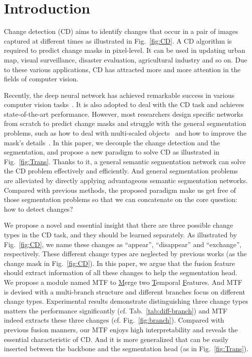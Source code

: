 \documentclass[review]{elsarticle}
\begin{document}
\section{Introduction}
\label{sec:intro}

Change detection (CD) aims to identify changes that occur in a pair of images captured at different times as illustrated in Fig.~\ref{fig:CD}. A CD algorithm is required to predict change masks in pixel-level. It can be used in updating urban map, visual surveillance, disaster evaluation, agricultural industry and so on. Due to these various applications, CD has attracted more and more attention in the fields of computer vision.

Recently, the deep neural network has achieved remarkable success in various computer vision tasks~\cite{wang2022versatile}. It is also adopted to deal with the CD task and achieves state-of-the-art performance. However, most researchers design specific networks from scratch to predict change masks and struggle with the general segmentation problems, such as how to deal with multi-scaled objects~\cite{HPCFNet} and how to improve the mask's details~\cite{DR_TANet}. In this paper, we decouple the change detection and the segmentation, and propose a new paradigm to solve CD as illustrated in Fig.~\ref{fig:Trans}. Thanks to it, a general semantic segmentation network can solve the CD problem effectively and efficiently. And general segmentation problems are alleviated by directly applying advantageous semantic segmentation networks. Compared with previous methods, the proposed paradigm make us get free of those segmentation problems so that we can concatenate on the core question: how to detect changes?

We propose a novel and essential insight that there are three possible change types in the CD task, and they should be learned separately. As illustrated by Fig.~\ref{fig:CD}, we name these changes as ``appear'', ``disappear'' and ``exchange'', respectively. These different change types are neglected by previous works (as the change mask in Fig.~\ref{fig:CD}). In this paper, we argue that the fusion feature should extract information of all these changes to help the segmentation head. We propose a module named MTF to \underline{M}erge two \underline{T}emporal \underline{F}eatures. And MTF is devised with a multi-branch structure and different branches focus on different change types. Experimental results demonstrate distinguishing three change types matters the performance significantly (cf. Tab.~\ref{tab:diff-branch}) and MTF indeed extracts these three changes (cf. Fig.~\ref{fig:branch}). Compared with previous fusion manners, our MTF enjoys high interpretability and reveals the essential characteristic of CD. And it is more generalized that can be easily inserted between the backbone and the segmentation head (as in Fig.~\ref{fig:Trans}).
\end{document}
